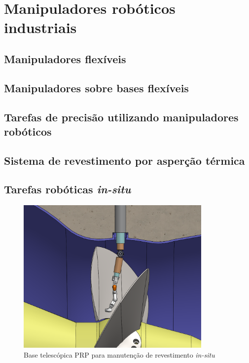\section{Manipuladores robóticos industriais}\label{sec::manind}

\subsection{Manipuladores flexíveis}

\subsection{Manipuladores sobre bases flexíveis}

\subsection{Tarefas de precisão utilizando manipuladores robóticos}

\subsection{Sistema de revestimento por asperção térmica} \label{sec::hvof}

\subsection{Tarefas robóticas \textit{in-situ}} \label{sec::insitu}



\begin{figure}[h]
	\centering 
 	\includegraphics[width=0.85\textwidth]{figs/base_telesc_turbina}
 	\caption{Base telescópica PRP para manutenção de revestimento
 	\textit{in-situ}}
 	\label{fig::base_telesc_turbina}
\end{figure}

